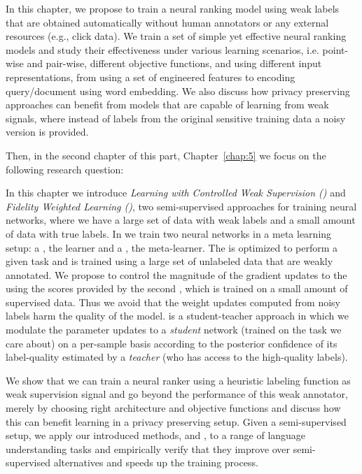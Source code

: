 In this chapter, we propose to train a neural ranking model using weak labels that are obtained automatically without human annotators or any external resources (e.g., click data). We train a set of simple yet effective neural ranking models and study their effectiveness under various learning scenarios, i.e. point-wise and pair-wise, different objective functions, and using different input representations, from using a set of engineered features to encoding query/document using word embedding. We also discuss how  privacy preserving approaches can benefit from models that are capable of learning from weak signals, where instead of labels from the original sensitive training data a noisy version is provided.

Then, in the second chapter of this part, Chapter~\ref{chap:5} we focus on the following research question:

In this chapter we introduce \emph{Learning with Controlled Weak Supervision (\cws)} and \emph{Fidelity Weighted Learning (\fwl)}, two semi-supervised approaches for training neural networks, where we have a large set of data with weak labels and a small amount of data with true labels. 
%
In \cws we train two neural networks in a meta learning setup: a \tnet, the learner and a \cnet, the meta-learner.  The \tnet is optimized to perform a given task and is trained using a large set of unlabeled data that are weakly annotated. We propose to control the magnitude of the gradient updates to the \tnet using the scores provided by the second \cnet, which is trained on a small amount of supervised data. Thus we avoid that the weight updates computed from noisy labels harm the quality of the \tnet model.
%
\fwl is a student-teacher approach in which we modulate the parameter updates to a \emph{student} network (trained on the task we care about) on a per-sample basis according to the posterior confidence of its label-quality estimated by a \emph{teacher} (who has access to the high-quality labels).  


We show that we can train a neural ranker using a heuristic labeling function as weak supervision signal and go beyond the performance of this weak annotator, merely by choosing right architecture and objective functions and discuss how this can benefit learning in a privacy preserving setup.
Given a semi-supervised setup, we apply our introduced methods, \cws and \fwl, to a range of language understanding tasks and empirically verify that they improve over semi-supervised alternatives and speeds up the training process. 

\medskip


